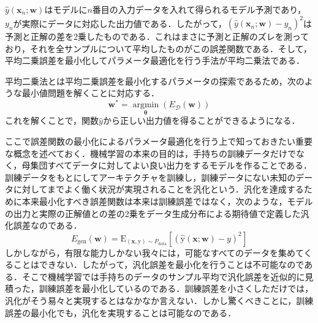 \documentclass[a4paper,11pt]{jsreport}
\begin{document}
$\hat{y}(\bm{x}_n; \bm{w})$はモデルに$n$番目の入力データを入れて得られるモデル予測であり，$y_n$が実際にデータに対応した出力値である．したがって，$(\hat{y}(\bm{x}_n; \bm{w}) - y_n)^2$は予測と正解の差を2乗したものである．これはまさに予測と正解のズレを測っており，それを全サンプルについて平均したものがこの誤差関数である．そして，平均二乗誤差を最小化してパラメータ最適化を行う手法が平均二乗法である．\par
平均二乗法とは平均二乗誤差を最小化するパラメータの探索であるため，次のような最小値問題を解くことに対応する．
\begin{equation}
  \bm{w}^* = \underset{\bm{\theta}} {\operatorname{argmin}} (E_{\mathcal{D}}(\bm{w}))
\end{equation}
これを解くことで，関数$\hat{y}$から正しい出力値を得ることができるようになる．\par
ここで誤差関数の最小化によるパラメータ最適化を行う上で知っておきたい重要な概念を述べておく．機械学習の本来の目的は，手持ちの訓練データだけでなく，母集団すべてデータに対してよい良い出力をするモデルを作ることである．訓練データをもとにしてアーキテクチャを訓練し，訓練データにない未知のデータに対してまでよく働く状況が実現されることを汎化という．汎化を達成するために本来最小化すべき誤差関数は本来は訓練誤差ではなく，次のような，モデルの出力と実際の正解値との差の2乗をデータ生成分布による期待値で定義した汎化誤差なのである．
\begin{equation}
  E_{\text{gen}}(\bm{w}) 
  = \mathrm{E}_{(\mathbf{x}, \mathrm{y}) \sim P_{\text{data}}} \left[ (\hat{\mathrm{y}}(\mathbf{x}; \bm{w}) - y)^2 \right]
\end{equation}
しかしながら，有限な能力しかない我々には，可能なすべてのデータを集めてくることはできない．したがって，汎化誤差を最小化を行うことは不可能なのである．そこで機械学習では手持ちのデータのサンプル平均で汎化誤差を近似的に見積った，訓練誤差を最小化しているのである．訓練誤差を小さくしただけでは，汎化がそう易々と実現するとはなかなか言えない．しかし驚くべきことに，訓練誤差の最小化でも，汎化を実現することは可能なのである．
\end{document}
